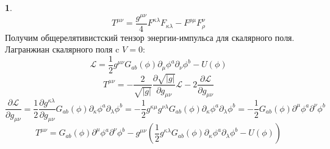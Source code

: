 \documentclass[12pt]{article}
\theoremstyle{definition}
\newtheorem{zad}{}[section]
\begin{document}
\begin{zad}
\begin{equation}
\end{equation}
\begin{equation}
    \boxed{T^{\mu\nu}=\frac{g^{\mu\nu}}{4}F^{\kappa\lambda}F_{\kappa\lambda}-F^{\rho\mu}F^\nu_\rho}
\end{equation}
Получим общерелятивистский тензор энергии-импульса для скалярного поля. Лагранжиан скалярного поля c $V=0$:
\begin{equation}
    \mathcal{L}=\frac{1}{2}g^{\mu\nu}G_{ab}(\phi)\partial_\mu\phi^a\partial_\nu\phi^b-U(\phi)
\end{equation}
\begin{equation}
    T^{\mu\nu}=-\frac{2}{\sqrt{|g|}}\frac{\partial\sqrt{|g|}}{\partial g_{\mu\nu}}\mathcal{L}-2\frac{\partial\mathcal{L}}{\partial g_{\mu\nu}}
\end{equation}
\begin{equation}
    \frac{\partial\mathcal{L}}{\partial g_{\mu\nu}}=\frac{1}{2}\frac{\partial g^{\kappa\lambda}}{\partial g_{\mu\nu}}G_{ab}(\phi)\partial_\kappa\phi^a\partial_\lambda\phi^b=-\frac{1}{2}g^{\kappa\mu}g^{\nu\lambda}G_{ab}(\phi)\partial_\kappa\phi^a\partial_\lambda\phi^b=-\frac{1}{2}G_{ab}(\phi)\partial^\mu\phi^a\partial^\nu\phi^b
\end{equation}
\begin{equation}
    \boxed{T^{\mu\nu}=G_{ab}(\phi)\partial^\mu\phi^a\partial^\nu\phi^b-g^{\mu\nu}\left(\frac{1}{2}g^{\kappa\lambda}G_{ab}(\phi)\partial_\kappa\phi^a\partial_\lambda\phi^b-U(\phi)\right)}
\end{equation}
\end{zad}
\end{document}
